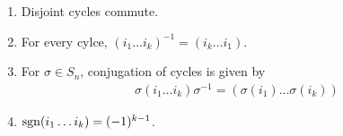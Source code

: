\begin{prop}[]
\phantom{a}

\begin{enumerate}
  \item Disjoint cycles commute.
  \item For every cylce, $(i_1 \dots i_k)^{-1} = (i_k \dots i_1)$.
  \item For $\sigma \in S_n$, conjugation of cycles is given by
    \begin{align*}
      \sigma (i_1  \dots i_k) \sigma^{-1} = (\sigma(i_1) \dots \sigma(i_k))
    \end{align*}
  \item $\operatorname{sgn}(i_1 \dots i_k) = (-1)^{k-1}$.
\end{enumerate}
\end{prop}

